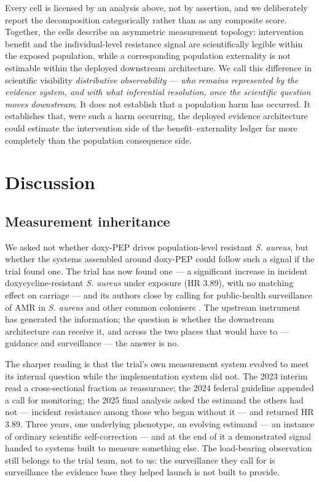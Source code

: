 \documentclass[10pt,letterpaper]{article}
\begin{document}
Every cell is licensed by an analysis above, not by assertion, and we
deliberately report the decomposition categorically rather than as any
composite score. Together, the cells describe an asymmetric measurement
topology: intervention benefit and the individual-level resistance
signal are scientifically legible within the exposed population, while a
corresponding population externality is not estimable within the
deployed downstream architecture. We call this difference in scientific
visibility \emph{distributive observability} --- \emph{who remains
represented by the evidence system, and with what inferential
resolution, once the scientific question moves downstream}. It does not
establish that a population harm has occurred. It establishes that, were
such a harm occurring, the deployed evidence architecture could estimate
the intervention side of the benefit--externality ledger far more
completely than the population consequence side.

\section*{Discussion}

\subsection*{Measurement inheritance}

We asked not whether doxy-PEP drives population-level resistant \emph{S.
aureus}, but whether the systems assembled around doxy-PEP could follow
such a signal if the trial found one. The trial has now found one --- a
significant increase in incident doxycycline-resistant \emph{S. aureus}
under exposure (HR 3.89), with no matching effect on carriage --- and
its authors close by calling for public-health surveillance of AMR in
\emph{S. aureus} and other common colonisers \cite{luetkemeyer2025}.
The upstream instrument has generated the information; the question is
whether the downstream architecture can receive it, and across the two
places that would have to --- guidance and surveillance --- the answer
is no.

The sharper reading is that the trial's own measurement system evolved
to meet its internal question while the implementation system did not.
The 2023 interim read a cross-sectional fraction as reassurance; the
2024 federal guideline appended a call for monitoring; the 2025 final
analysis asked the estimand the others had not --- incident resistance
among those who began without it --- and returned HR 3.89. Three years,
one underlying phenotype, an evolving estimand --- an instance of ordinary
scientific self-correction --- and at the end of it a demonstrated
signal handed to systems built to measure something else. The
load-bearing observation still belongs to the trial team, not to us: the
surveillance they call for is surveillance the evidence base they helped
launch is not built to provide.
\end{document}
